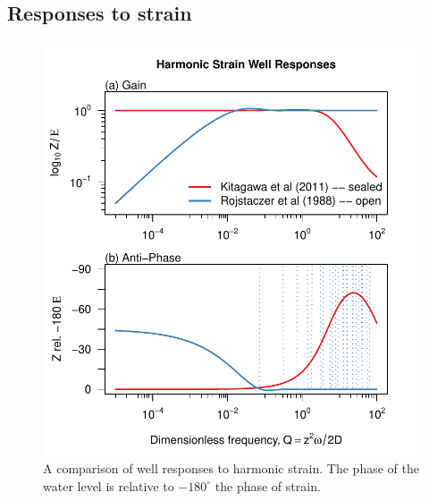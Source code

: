 \documentclass[12pt]{article}\usepackage[]{graphicx}\usepackage[]{color}
\makeatletter
\def\maxwidth{ %
  \ifdim\Gin@nat@width>\linewidth
    \linewidth
  \else
    \Gin@nat@width
  \fi
}
\newenvironment{knitrout}{}{} %
\makeatother
\begin{document}
\subsection{Responses to strain}
\begin{figure}[htb!]
\begin{center}
\begin{knitrout}\small
{}\color{fgcolor}
\includegraphics[width=\maxwidth]{figure/ALLRESPFIG} 

\end{knitrout}

\caption{A comparison of well responses to harmonic strain. 
The phase of the water level is relative to $-180^\circ$ the phase of strain.}
\label{fig:ewrsp-all}
\end{center}
\end{figure}

\clearpage
\end{document}
